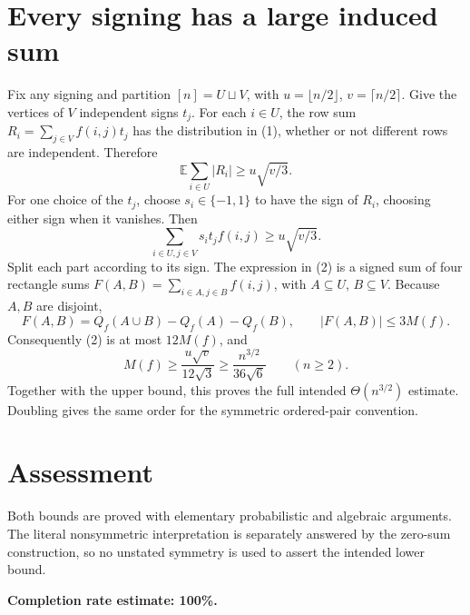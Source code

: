 \documentclass[11pt]{article}
\begin{document}
\section*{Every signing has a large induced sum}
Fix any signing and partition $[n]=U\sqcup V$, with $u=\lfloor n/2\rfloor$, $v=\lceil n/2\rceil$. Give the vertices of $V$ independent signs $t_j$. For each $i\in U$, the row sum $R_i=\sum_{j\in V}f(i,j)t_j$ has the distribution in (1), whether or not different rows are independent. Therefore
\[
 \mathbb E\sum_{i\in U}|R_i|\ge u\sqrt{v/3}.
\]
For one choice of the $t_j$, choose $s_i\in\{-1,1\}$ to have the sign of $R_i$, choosing either sign when it vanishes. Then
\[
 \sum_{i\in U,j\in V}s_i t_jf(i,j)\ge u\sqrt{v/3}. \tag{2}
\]
Split each part according to its sign. The expression in (2) is a signed sum of four rectangle sums $F(A,B)=\sum_{i\in A,j\in B}f(i,j)$, with $A\subseteq U$, $B\subseteq V$. Because $A,B$ are disjoint,
\[
 F(A,B)=Q_f(A\cup B)-Q_f(A)-Q_f(B),
 \qquad |F(A,B)|\le3M(f).
\]
Consequently (2) is at most $12M(f)$, and
\[
 M(f)\ge\frac{u\sqrt v}{12\sqrt3}\ge\frac{n^{3/2}}{36\sqrt6}\qquad(n\ge2).
\]
Together with the upper bound, this proves the full intended $\Theta(n^{3/2})$ estimate. Doubling gives the same order for the symmetric ordered-pair convention.

\section*{Assessment}
Both bounds are proved with elementary probabilistic and algebraic arguments. The literal nonsymmetric interpretation is separately answered by the zero-sum construction, so no unstated symmetry is used to assert the intended lower bound.

\textbf{Completion rate estimate: 100\%.}
\end{document}
